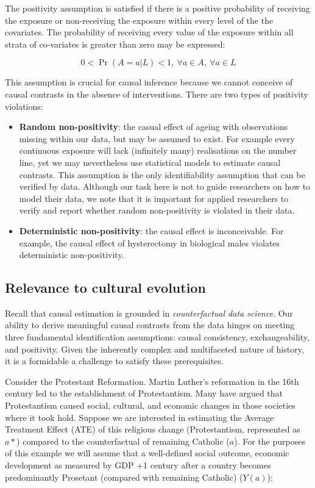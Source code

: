 \documentclass[
  singlecolumn]{report}
\begin{document}
The positivity assumption is satisfied if there is a positive
probability of receiving the exposure or non-receiving the exposure
within every level of the the covariates. The probability of receiving
every value of the exposure within all strata of co-variates is greater
than zero may be expressed:

\begin{equation}
0 < \Pr(A=a|L)<1, ~ \forall a \in A, ~ \forall a \in L
\end{equation}

This assumption is crucial for causal inference because we cannot
conceive of causal contrasts in the absence of interventions. There are
two types of positivity violations:

\begin{itemize}
\item
  \textbf{Random non-positivity}: the casual effect of ageing with
  observations missing within our data, but may be assumed to exist. For
  example every continuous exposure will lack (infinitely many)
  realisations on the number line, yet we may nevertheless use
  statistical models to estimate causal contrasts. This assumption is
  the only identifiability assumption that can be verified by data.
  Although our task here is not to guide researchers on how to model
  their data, we note that it is important for applied researchers to
  verify and report whether random non-positivity is violated in their
  data.
\item
  \textbf{Deterministic non-positivity}: the causal effect is
  inconceivable. For example, the causal effect of hysterectomy in
  biological males violates deterministic non-positivity.
\end{itemize}

\hypertarget{relevance-to-cultural-evolution}{%
\subsection{Relevance to cultural
evolution}\label{relevance-to-cultural-evolution}}

Recall that causal estimation is grounded in \emph{counterfactual data
science}. Our ability to derive meaningful causal contrasts from the
data hinges on meeting three fundamental identification assumptions:
causal consistency, exchangeability, and positivity. Given the
inherently complex and multifaceted nature of history, it is a
formidable a challenge to satisfy these prerequisites.

Consider the Protestant Reformation. Martin Luther's reformation in the
16th century led to the establishment of Protestantism. Many have argued
that Protestantism caused social, cultural, and economic changes in
those societies where it took hold. Suppose we are interested in
estimating the Average Treatment Effect (ATE) of this religious change
(Protestantism, represented as \(a*\)) compared to the counterfactual of
remaining Catholic (\(a\)). For the purposes of this example we will
assume that a well-defined social outcome, economic development as
measured by GDP +1 century after a country becomes predominantly
Prosetant (compared with remaining Catholic) (\(Y(a)\)):
\end{document}
